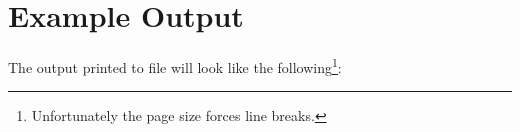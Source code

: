 \chapter{Example Output}\label{ch:example_output} %

The output printed to file will look like the following\footnote{Unfortunately the page size forces line breaks.}:

